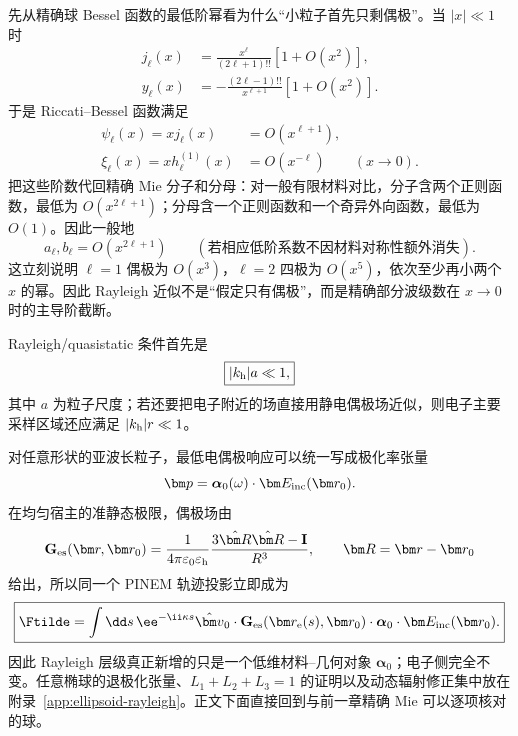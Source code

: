 先从精确球 Bessel 函数的最低阶幂看为什么“小粒子首先只剩偶极”。当 $|x|\ll1$ 时
\begin{align}
j_\ell(x)&=\frac{x^\ell}{(2\ell+1)!!}\left[1+O(x^2)\right],\\
y_\ell(x)&=-\frac{(2\ell-1)!!}{x^{\ell+1}}\left[1+O(x^2)\right].
\label{eq:smallx-spherical-bessel-general}
\end{align}
于是 Riccati--Bessel 函数满足
\begin{align}
\psi_\ell(x)=xj_\ell(x)&=O(x^{\ell+1}),\\
\xi_\ell(x)=xh_\ell^{(1)}(x)&=O(x^{-\ell})
\qquad (x\to0).
\end{align}
把这些阶数代回精确 Mie 分子和分母：对一般有限材料对比，分子含两个正则函数，最低为 $O(x^{2\ell+1})$；分母含一个正则函数和一个奇异外向函数，最低为 $O(1)$。因此一般地
\begin{equation}
\boxed{a_\ell,b_\ell=O(x^{2\ell+1})}
\qquad (\text{若相应低阶系数不因材料对称性额外消失}).
\label{eq:mie-multipole-scaling}
\end{equation}
这立刻说明 $\ell=1$ 偶极为 $O(x^3)$，$\ell=2$ 四极为 $O(x^5)$，依次至少再小两个 $x$ 的幂。因此 Rayleigh 近似不是“假定只有偶极”，而是精确部分波级数在 $x\to0$ 时的主导阶截断。

Rayleigh/quasistatic 条件首先是
\begin{equation}
\boxed{|k_{\rm h}|a\ll1,}
\label{eq:rayleigh-size-condition}
\end{equation}
其中 $a$ 为粒子尺度；若还要把电子附近的场直接用静电偶极场近似，则电子主要采样区域还应满足 $|k_{\rm h}|r\ll1$。

对任意形状的亚波长粒子，最低电偶极响应可以统一写成极化率张量
\begin{equation}
\bm p=\boldsymbol\alpha_0(\omega)\cdot\bm E_{\rm inc}(\bm r_0).
\label{eq:general-quasistatic-polarizability-def}
\end{equation}
在均匀宿主的准静态极限，偶极场由
\begin{equation}
\mathbf G_{\rm es}(\bm r,\bm r_0)
=\frac{1}{4\pi\varepsilon_0\varepsilon_{\rm h}}
\frac{3\hat{\bm R}\hat{\bm R}-\mathbf I}{R^3},
\qquad \bm R=\bm r-\bm r_0
\end{equation}
给出，所以同一个 PINEM 轨迹投影立即成为
\begin{equation}
\boxed{
\Ftilde
=\int\dd s\,\ee^{-\ii\kappa s}
\hat{\bm v}_0\cdot
\mathbf G_{\rm es}(\bm r_{\rm e}(s),\bm r_0)
\cdot\boldsymbol\alpha_0\cdot\bm E_{\rm inc}(\bm r_0).}
\label{eq:rayleigh-general-tensor-trajectory}
\end{equation}
因此 Rayleigh 层级真正新增的只是一个低维材料--几何对象 $\boldsymbol\alpha_0$；电子侧完全不变。任意椭球的退极化张量、$L_1+L_2+L_3=1$ 的证明以及动态辐射修正集中放在附录~\ref{app:ellipsoid-rayleigh}。正文下面直接回到与前一章精确 Mie 可以逐项核对的球。


